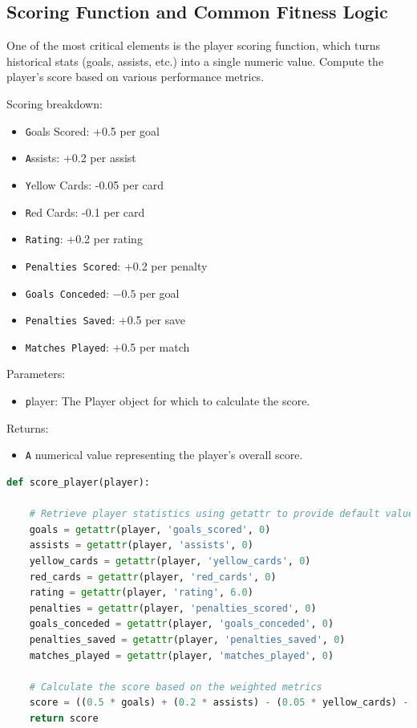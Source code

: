 \documentclass[sigconf]{acmart}
\begin{document}
	\subsection{Scoring Function and Common Fitness Logic}
	\label{sec:score-fitness}
	One of the most critical elements is the player scoring function, which turns historical stats (goals, assists, etc.) into a single numeric value. Compute the player's score based on various performance metrics.
	
Scoring breakdown:
		\begin{itemize}
\item \texttt Goals Scored: +0.5 per goal
\item \texttt Assists: +0.2 per assist
\item \texttt Yellow Cards: -0.05 per card
\item \texttt Red Cards: -0.1 per card
\item \texttt{Rating}: +0.2 per rating
\item \texttt{Penalties Scored}: +0.2 per penalty
\item \texttt{Goals Conceded}: $-0.5$ per goal           
\item \texttt{Penalties Saved}: +0.5 per save             
\item \texttt{Matches Played}: +0.5 per match            

\end{itemize}
	
Parameters:
		\begin{itemize}
\item \texttt player: The Player object for which to calculate the score.
\end{itemize}
	
Returns:
		\begin{itemize}
\item \texttt A numerical value representing the player's overall score.
\end{itemize}
	
\begin{lstlisting}[language=Python, caption=Example scoring function in utils.py]
def score_player(player):

	# Retrieve player statistics using getattr to provide default values if not set
	goals = getattr(player, 'goals_scored', 0)
	assists = getattr(player, 'assists', 0)
	yellow_cards = getattr(player, 'yellow_cards', 0)
	red_cards = getattr(player, 'red_cards', 0)
	rating = getattr(player, 'rating', 6.0)
	penalties = getattr(player, 'penalties_scored', 0)
	goals_conceded = getattr(player, 'goals_conceded', 0)
	penalties_saved = getattr(player, 'penalties_saved', 0)
	matches_played = getattr(player, 'matches_played', 0)
	
	# Calculate the score based on the weighted metrics
	score = ((0.5 * goals) + (0.2 * assists) - (0.05 * yellow_cards) - (0.1 * red_cards) + (0.2 * rating) + (0.2 * penalties)) - (0.5 * goals_conceded) + (0.5 * penalties_saved) + (0.5 * matches_played)
	return score
	\end{lstlisting}
	
\end{document}
